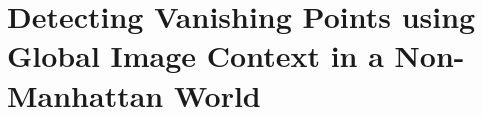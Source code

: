 \chapter{Detecting Vanishing Points using Global Image Context in a Non-Manhattan World}
\label{chap:fasthorizon}


\copyrightnotice 
